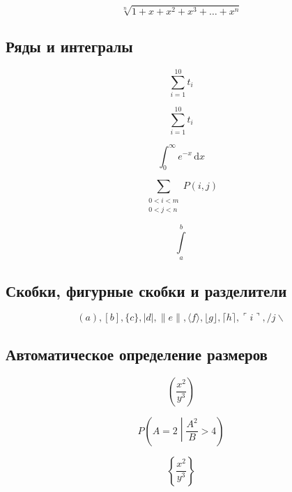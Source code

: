 \begin{equation}
\sqrt[n]{1+x+x^2+x^3+\dots+x^n}
\end{equation}

\subsection{Ряды и интегралы}
\begin{equation}
\sum_{i=1}^{10} t_i
\end{equation}

\begin{equation}
\displaystyle\sum_{i=1}^{10} t_i
\end{equation}

\begin{equation}
\int_0^\infty e^{-x}\,\mathrm{d}x
\end{equation}

\begin{equation}
\sum_{\substack{
   0<i<m \\
   0<j<n
  }} 
 P(i,j)
\end{equation}

\begin{equation}
\int\limits_a^b
\end{equation}

\subsection{Скобки, фигурные скобки и разделители}
\begin{equation}
( a ), [ b ], \{ c \}, | d |, \| e \|, \langle f \rangle, \lfloor g \rfloor, \lceil h \rceil, \ulcorner i \urcorner, / j \backslash
\end{equation}

\subsection{Автоматическое определение размеров}
\begin{equation}
\left(\frac{x^2}{y^3}\right)
\end{equation}

\begin{equation}
P\left(A=2\middle|\frac{A^2}{B}>4\right)
\end{equation}

\begin{equation}
\left\{\frac{x^2}{y^3}\right\}
\end{equation}

